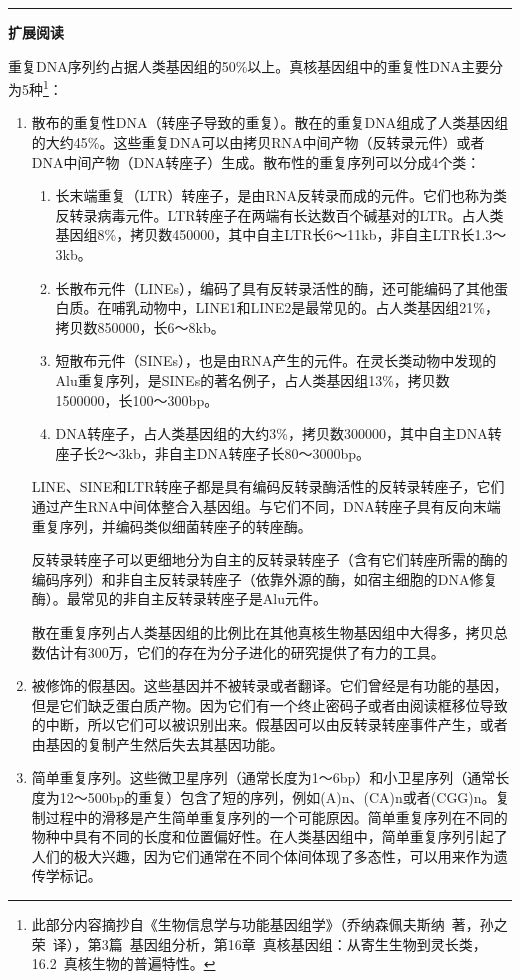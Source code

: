 \documentclass[11pt,a4paper,twoside]{book}
\begin{document}
\vspace{0.5cm}
\hrule height 3pt

\noindent
{\large \bfseries \HandPencilLeft 扩展阅读}

{\small
重复DNA序列约占据人类基因组的50\%以上。真核基因组中的重复性DNA主要分为5种\footnote{此部分内容摘抄自《生物信息学与功能基因组学》（乔纳森\textbullet 佩夫斯纳\ 著，孙之荣\ 译），第3篇\ 基因组分析，第16章\ 真核基因组：从寄生生物到灵长类，16.2\ 真核生物的普遍特性。}：
\begin{enumerate}
  \item 散布的重复性DNA（转座子导致的重复）。散在的重复DNA组成了人类基因组的大约45\%。这些重复DNA可以由拷贝RNA中间产物（反转录元件）或者DNA中间产物（DNA转座子）生成。散布性的重复序列可以分成4个类：
    \begin{enumerate}
      \item 长末端重复（LTR）转座子，是由RNA反转录而成的元件。它们也称为类反转录病毒元件。LTR转座子在两端有长达数百个碱基对的LTR。占人类基因组8\%，拷贝数450000，其中自主LTR长6～11kb，非自主LTR长1.3～3kb。
      \item 长散布元件（LINEs），编码了具有反转录活性的酶，还可能编码了其他蛋白质。在哺乳动物中，LINE1和LINE2是最常见的。占人类基因组21\%，拷贝数850000，长6～8kb。
      \item 短散布元件（SINEs），也是由RNA产生的元件。在灵长类动物中发现的Alu重复序列，是SINEs的著名例子，占人类基因组13\%，拷贝数1500000，长100～300bp。
      \item DNA转座子，占人类基因组的大约3\%，拷贝数300000，其中自主DNA转座子长2～3kb，非自主DNA转座子长80～3000bp。
    \end{enumerate}
    LINE、SINE和LTR转座子都是具有编码反转录酶活性的反转录转座子，它们通过产生RNA中间体整合入基因组。与它们不同，DNA转座子具有反向末端重复序列，并编码类似细菌转座子的转座酶。

    反转录转座子可以更细地分为自主的反转录转座子（含有它们转座所需的酶的编码序列）和非自主反转录转座子（依靠外源的酶，如宿主细胞的DNA修复酶）。最常见的非自主反转录转座子是Alu元件。

    散在重复序列占人类基因组的比例比在其他真核生物基因组中大得多，拷贝总数估计有300万，它们的存在为分子进化的研究提供了有力的工具。
  \item 被修饰的假基因。这些基因并不被转录或者翻译。它们曾经是有功能的基因，但是它们缺乏蛋白质产物。因为它们有一个终止密码子或者由阅读框移位导致的中断，所以它们可以被识别出来。假基因可以由反转录转座事件产生，或者由基因的复制产生然后失去其基因功能。
  \item 简单重复序列。这些微卫星序列（通常长度为1～6bp）和小卫星序列（通常长度为12～500bp的重复）包含了短的序列，例如(A)n、(CA)n或者(CGG)n。复制过程中的滑移是产生简单重复序列的一个可能原因。简单重复序列在不同的物种中具有不同的长度和位置偏好性。在人类基因组中，简单重复序列引起了人们的极大兴趣，因为它们通常在不同个体间体现了多态性，可以用来作为遗传学标记。


\end{enumerate}}
\end{document}
